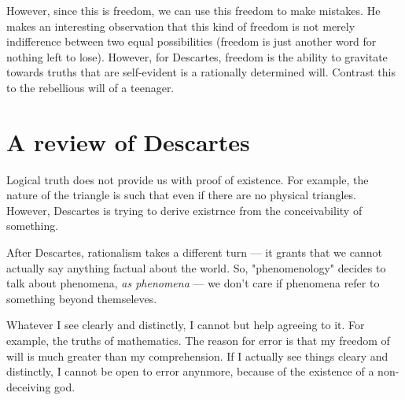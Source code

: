 \documentclass[11pt]{book}
\begin{document}
However, since this is freedom, we can use this freedom to make mistakes.
He makes an interesting observation that this kind of freedom is not merely indifference
between two equal possibilities (freedom is just another word for nothing left to lose).
However, for Descartes, freedom is the ability to gravitate towards truths that
are self-evident is a rationally determined will. Contrast this to the rebellious
will of a teenager.

\section{A review of Descartes}

Logical truth does not provide us with proof of existence. For example, the
nature of the triangle is such that even if there are no physical triangles.
However, Descartes is trying to derive existrnce from the conceivability of
something.

After Descartes, rationalism takes a different turn --- it grants that we
cannot actually say anything factual about the world. So, "phenomenology"
decides to talk about phenomena, \textit{as phenomena} --- we don't care
if phenomena refer to something beyond themseleves.

Whatever I see clearly and distinctly, I cannot but help agreeing to it. For
example, the truths of mathematics. The reason for error is that my freedom of
will is much greater than my comprehension. If I actually see things cleary and
distinctly, I cannot be open to error anynmore, because of the existence of a
non-deceiving god.
\end{document}
